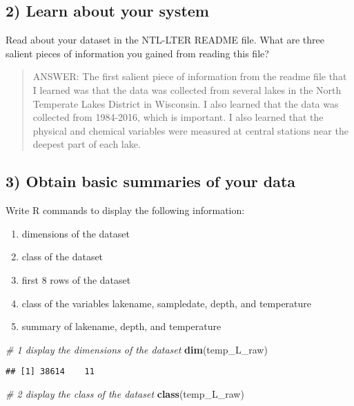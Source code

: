 \documentclass[]{article}
\newenvironment{Shaded}{\begin{snugshade}}{\end{snugshade}}
\newcommand{\KeywordTok}[1]{\textcolor[rgb]{0.13,0.29,0.53}{\textbf{#1}}}
\newcommand{\CommentTok}[1]{\textcolor[rgb]{0.56,0.35,0.01}{\textit{#1}}}
\newcommand{\NormalTok}[1]{#1}
\providecommand{\tightlist}{%
  \setlength{\itemsep}{0pt}\setlength{\parskip}{0pt}}
\begin{document}
\subsection{2) Learn about your system}\label{learn-about-your-system}

Read about your dataset in the NTL-LTER README file. What are three
salient pieces of information you gained from reading this file?

\begin{quote}
ANSWER: The first salient piece of information from the readme file that
I learned was that the data was collected from several lakes in the
North Temperate Lakes District in Wisconsin. I also learned that the
data was collected from 1984-2016, which is important. I also learned
that the physical and chemical variables were measured at central
stations near the deepest part of each lake.
\end{quote}

\subsection{3) Obtain basic summaries of your
data}\label{obtain-basic-summaries-of-your-data}

Write R commands to display the following information:

\begin{enumerate}
\def\labelenumi{\arabic{enumi}.}
\tightlist
\item
  dimensions of the dataset
\item
  class of the dataset
\item
  first 8 rows of the dataset
\item
  class of the variables lakename, sampledate, depth, and temperature
\item
  summary of lakename, depth, and temperature
\end{enumerate}

\begin{Shaded}
\begin{Highlighting}[]
\CommentTok{# 1 display the dimensions of the dataset}
\KeywordTok{dim}\NormalTok{(temp_L_raw)}
\end{Highlighting}
\end{Shaded}

\begin{verbatim}
## [1] 38614    11
\end{verbatim}

\begin{Shaded}
\begin{Highlighting}[]
\CommentTok{# 2 display the class of the dataset }
\KeywordTok{class}\NormalTok{(temp_L_raw)}
\end{Highlighting}
\end{Shaded}
\end{document}
